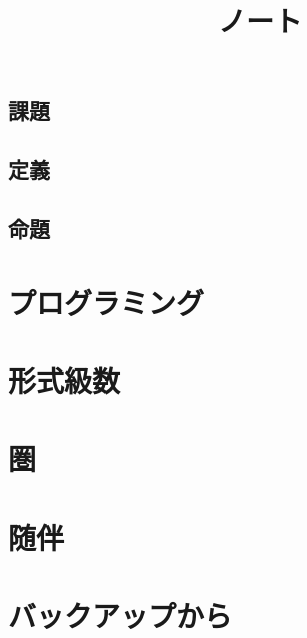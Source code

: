 \documentclass[5pt]{jreport}
\title{ノート}
\author{}
\begin{document}
\maketitle
\tableofcontents
\section*{課題}
\section*{定義}
\section*{命題}

\chapter{プログラミング}


\chapter{形式級数}

\chapter{圏}

\chapter{随伴}

\chapter{バックアップから}




\end{document}
